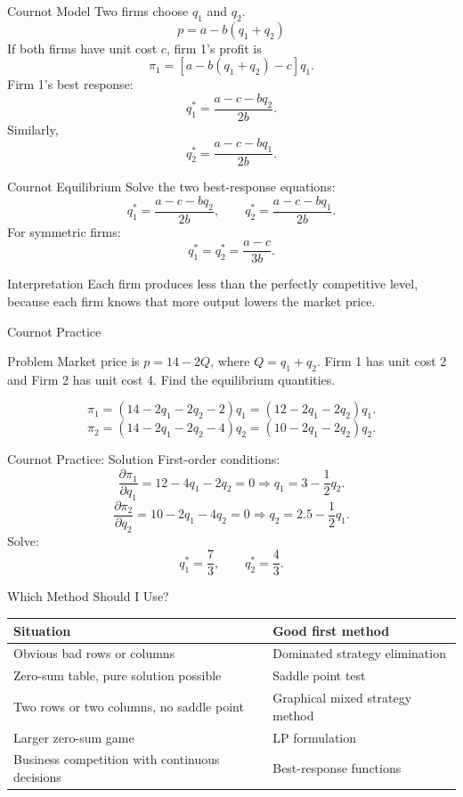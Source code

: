 \documentclass[10pt,aspectratio=169]{beamer}
\begin{document}
\begin{frame}{Cournot Model}
Two firms choose $q_1$ and $q_2$.
\[
p=a-b(q_1+q_2)
\]
If both firms have unit cost $c$, firm 1's profit is
\[
\pi_1=[a-b(q_1+q_2)-c]q_1.
\]
Firm 1's best response:
\[
q_1^*=\frac{a-c-bq_2}{2b}.
\]
Similarly,
\[
q_2^*=\frac{a-c-bq_1}{2b}.
\]
\end{frame}

\begin{frame}{Cournot Equilibrium}
Solve the two best-response equations:
\[
q_1^*=\frac{a-c-bq_2}{2b},\qquad
q_2^*=\frac{a-c-bq_1}{2b}.
\]
For symmetric firms:
\[
q_1^*=q_2^*=\frac{a-c}{3b}.
\]
\vspace{0.2cm}
\begin{block}{Interpretation}
Each firm produces less than the perfectly competitive level, because each firm knows that more output lowers the market price.
\end{block}
\end{frame}

\begin{frame}{Cournot Practice}
\begin{block}{Problem}
Market price is $p=14-2Q$, where $Q=q_1+q_2$. Firm 1 has unit cost 2 and Firm 2 has unit cost 4. Find the equilibrium quantities.
\end{block}
\vspace{0.2cm}
\[
\pi_1=(14-2q_1-2q_2-2)q_1=(12-2q_1-2q_2)q_1.
\]
\[
\pi_2=(14-2q_1-2q_2-4)q_2=(10-2q_1-2q_2)q_2.
\]
\end{frame}

\begin{frame}{Cournot Practice: Solution}
First-order conditions:
\[
\frac{\partial \pi_1}{\partial q_1}=12-4q_1-2q_2=0
\Rightarrow q_1=3-\frac{1}{2}q_2.
\]
\[
\frac{\partial \pi_2}{\partial q_2}=10-2q_1-4q_2=0
\Rightarrow q_2=2.5-\frac{1}{2}q_1.
\]
Solve:
\[
q_1^*=\frac{7}{3},\qquad q_2^*=\frac{4}{3}.
\]
\end{frame}

\begin{frame}{Which Method Should I Use?}
\begin{center}
\begin{tabular}{p{} p{}}
\toprule
Situation & Good first method\\
\midrule
Obvious bad rows or columns & Dominated strategy elimination\\
Zero-sum table, pure solution possible & Saddle point test\\
Two rows or two columns, no saddle point & Graphical mixed strategy method\\
Larger zero-sum game & LP formulation\\
Business competition with continuous decisions & Best-response functions\\
\bottomrule
\end{tabular}
\end{center}
\end{frame}
\end{document}
